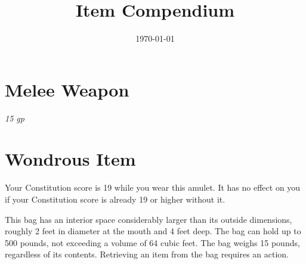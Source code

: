 \documentclass[letterpaper, 11pt, bg=full, twocolumn, stats=modern]{dndbook}
\title{Item Compendium}
\date{\today}
\begin{document}
\tableofcontents
\clearpage

\section{Melee Weapon}

\vspace{0.5em}



\textit{15 gp}



\vspace{1.5em}

\section{Wondrous Item}

\vspace{0.5em}





Your Constitution score is 19 while you wear this amulet. It has no effect on you if your Constitution score is already 19 or higher without it.

\vspace{0.8em}




This bag has an interior space considerably larger than its outside dimensions, roughly 2 feet in diameter at the mouth and 4 feet deep. The bag can hold up to 500 pounds, not exceeding a volume of 64 cubic feet. The bag weighs 15 pounds, regardless of its contents. Retrieving an item from the bag requires an action.
\end{document}
